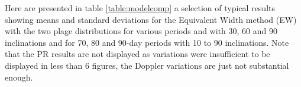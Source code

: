 Here are presented in table \ref{table:modelcomp} a selection of typical results showing means and standard deviations
for the Equivalent Width method (EW) with the two plage distributions for various periods and with 30{\degree},
60{\degree} and 90{\degree} inclinations and for 70, 80 and 90-day periods with 10{\degree} to 90{\degree} inclinations.
Note that the PR results are not displayed as variations were insufficient to be displayed in less than 6 figures, the
Doppler variations are just not substantial enough.

\begin{table}[!htbp]
\centering
{}

\vspace{5 mm}


\end{table}
